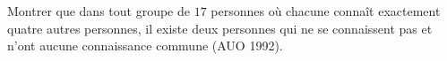 Montrer que dans tout groupe de $17$ personnes où chacune connaît exactement quatre autres personnes, il existe deux personnes qui ne se connaissent pas et n'ont aucune connaissance commune (AUO 1992).
